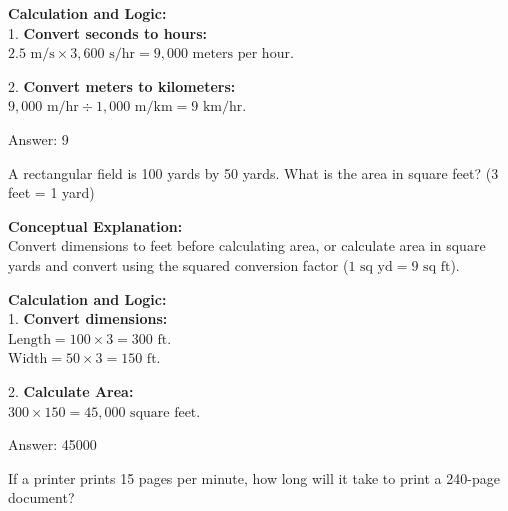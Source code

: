 \documentclass[11pt,paper=a4,answers]{exam}
\begin{document}
\begin{questions}
\begin{solution}
\textbf{Calculation and Logic:} \\
1. \textbf{Convert seconds to hours:} \\
$2.5 \text{ m/s} \times 3,600 \text{ s/hr} = 9,000 \text{ meters per hour}$.

\vspace{15pt}

2. \textbf{Convert meters to kilometers:} \\
$9,000 \text{ m/hr} \div 1,000 \text{ m/km} = 9 \text{ km/hr}$.

\vspace{30pt}

Answer: \colorbox{yellow!100}{9}
\end{solution}

\vspace{60pt}

\question
A rectangular field is 100 yards by 50 yards. What is the area in square feet? (3 feet = 1 yard)

\begin{solution}
\textbf{Conceptual Explanation:} \\
Convert dimensions to feet before calculating area, or calculate area in square yards and convert using the squared conversion factor ($1 \text{ sq yd} = 9 \text{ sq ft}$).

\vspace{30pt}

\textbf{Calculation and Logic:} \\
1. \textbf{Convert dimensions:} \\
$\text{Length} = 100 \times 3 = 300 \text{ ft}$. \\
$\text{Width} = 50 \times 3 = 150 \text{ ft}$.

\vspace{15pt}

2. \textbf{Calculate Area:} \\
$300 \times 150 = 45,000 \text{ square feet}$.

\vspace{30pt}

Answer: \colorbox{yellow!100}{45000}
\end{solution}

\vspace{60pt}

\question
If a printer prints 15 pages per minute, how long will it take to print a 240-page document?


\end{questions}
\end{document}
